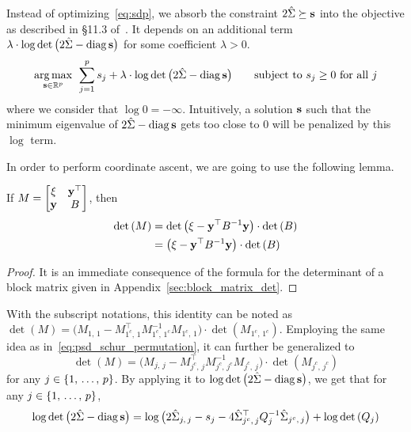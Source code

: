 Instead of optimizing~\ref{eq:sdp},
we absorb the constraint $2\hat{\Sigma} \succeq \mathbf{s}$ into the objective as described in §11.3 of~\cite{convex_optimization}.
It depends on an additional term
$\lambda \cdot \log\det\big( 2\hat{\Sigma} - \operatorname*{diag}\mathbf{s} \big)$
for some coefficient $\lambda > 0$.
\begin{equation}\label{eq:sdp_log_barrier}
    \underset{\mathbf{s} \in \mathbb{R}^p}{\operatorname*{arg\,max}}\;\,
    \sum_{j = 1}^p s_j
    + \lambda \cdot \log\det\big( 2\hat{\Sigma} - \operatorname*{diag}\mathbf{s} \big)
    \qquad
    \text{subject to }
    s_j \geq 0\text{ for all } j
\end{equation}
where we consider that $\log 0 = -\infty$.
Intuitively, a solution $\mathbf{s}$ such that the minimum eigenvalue of $2\hat{\Sigma} - \operatorname*{diag}\mathbf{s}$ gets too close to $0$
will be penalized by this $\log$ term.

In order to perform coordinate ascent, we are going to use the following lemma.
\begin{lemma}
    If $M = \begin{bmatrix}
        \xi & \mathbf{y}^\top\\
        \mathbf{y} & B
    \end{bmatrix}$,
    then
    \begin{align*}
        \det\left( M \right) &= \det\big( \xi - \mathbf{y}^\top B^{-1} \mathbf{y} \big) \cdot \det\left( B \right)\\
        &= \big( \xi - \mathbf{y}^\top B^{-1} \mathbf{y} \big) \cdot \det\left( B \right)
    \end{align*}
\end{lemma}
\begin{proof}
    It is an immediate consequence of the formula for the determinant of a block matrix
    given in Appendix~\ref{sec:block_matrix_det}.
\end{proof}
With the subscript notations, this identity can be noted as
$\det\left( M \right) = \big( M_{1,\, 1} - M_{1^c,\, 1}^\top M_{1^c,\, 1^c}^{-1} M_{1^c,\, 1} \big)
    \cdot\det\left( M_{1^c,\, 1^c} \right)$.
Employing the same idea as in~\ref{eq:psd_schur_permutation},
it can further be generalized to
\begin{equation*}
    \det\left( M \right) = \big( M_{j,\, j} - M_{j^c,\, j}^\top M_{j^c,\, j^c}^{-1} M_{j^c,\, j} \big)
        \cdot\det\left( M_{j^c,\, j^c} \right)
\end{equation*}
for any $j \in \left\{ 1,\, \dots,\, p \right\}$.
\bigbreak
By applying it to $\log\det\big( 2\hat{\Sigma} - \operatorname*{diag}\mathbf{s} \big)$,
we get that for any $j \in \left\{ 1,\, \dots,\, p \right\}$,
\begin{equation*}
    \log\det\big( 2\hat{\Sigma} - \operatorname*{diag}\mathbf{s} \big) =
        \log\big( 2\hat{\Sigma}_{j,\, j} - s_j - 4\hat{\Sigma}_{j^c,\, j}^\top Q_j^{-1} \hat{\Sigma}_{j^c,\, j} \big)
            + \log\det\left( Q_j \right)
\end{equation*}
